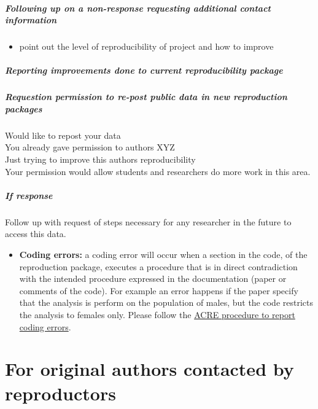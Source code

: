 \documentclass[]{book}
\providecommand{\tightlist}{%
  \setlength{\itemsep}{0pt}\setlength{\parskip}{0pt}}
\let\oldsubparagraph\subparagraph
\renewcommand{\subparagraph}[1]{\oldsubparagraph{#1}\mbox{}}
\begin{document}
\hypertarget{following-up-on-a-non-response-requesting-additional-contact-information}{%
\subparagraph{Following up on a non-response requesting additional contact information}\label{following-up-on-a-non-response-requesting-additional-contact-information}}

\begin{itemize}
\tightlist
\item
  point out the level of reproducibility of project and how to improve
\end{itemize}

\hypertarget{reporting-improvements-done-to-current-reproducibility-package}{%
\subparagraph{Reporting improvements done to current reproducibility package}\label{reporting-improvements-done-to-current-reproducibility-package}}

\hypertarget{requestion-permission-to-re-post-public-data-in-new-reproduction-packages}{%
\subparagraph{Requestion permission to re-post public data in new reproduction packages}\label{requestion-permission-to-re-post-public-data-in-new-reproduction-packages}}

Would like to repost your data\\
You already gave permission to authors XYZ\\
Just trying to improve this authors reproducibility\\
Your permission would allow students and researchers do more work in this area.

\hypertarget{if-response}{%
\subparagraph{If response}\label{if-response}}

Follow up with request of steps necessary for any researcher in the future to access this data.

\begin{itemize}
\tightlist
\item
  \textbf{Coding errors:} a coding error will occur when a section in the code, of the reproduction package, executes a procedure that is in direct contradiction with the intended procedure expressed in the documentation (paper or comments of the code). For example an error happens if the paper specify that the analysis is perform on the population of males, but the code restricts the analysis to females only. Please follow the \href{ADD\%20LINK}{ACRE procedure to report coding errors}.
\end{itemize}

\hypertarget{for-original-authors-contacted-by-reproductors}{%
\section{For original authors contacted by reproductors}\label{for-original-authors-contacted-by-reproductors}}
\end{document}
